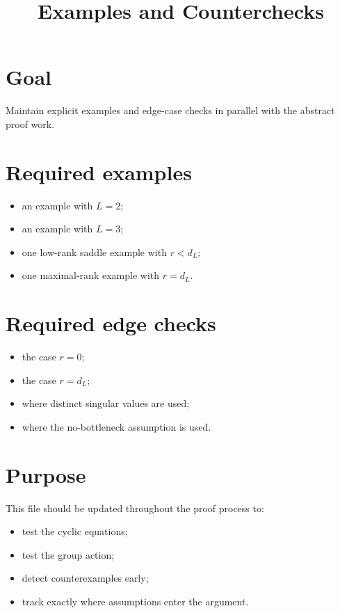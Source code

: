 \documentclass{article}
\title{Examples and Counterchecks}
\date{}
\theoremstyle{definition}
\begin{document}
\maketitle

\section{Goal}

Maintain explicit examples and edge-case checks in parallel with the abstract proof work.

\section{Required examples}

\begin{itemize}
\item an example with $L=2$;
\item an example with $L=3$;
\item one low-rank saddle example with $r<d_L$;
\item one maximal-rank example with $r=d_L$.
\end{itemize}

\section{Required edge checks}

\begin{itemize}
\item the case $r=0$;
\item the case $r=d_L$;
\item where distinct singular values are used;
\item where the no-bottleneck assumption is used.
\end{itemize}

\section{Purpose}

This file should be updated throughout the proof process to:

\begin{itemize}
\item test the cyclic equations;
\item test the group action;
\item detect counterexamples early;
\item track exactly where assumptions enter the argument.
\end{itemize}
\end{document}
